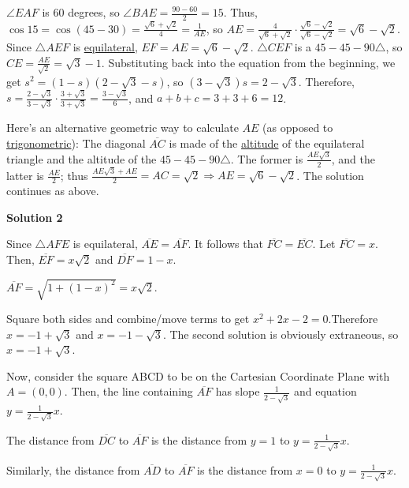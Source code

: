 \begin{enumerate}
 $\angle EAF$ is $60$ degrees, so $\angle BAE = \frac{90 - 60}{2} = 15$. Thus, $\cos 15 = \cos (45 - 30) = \frac{\sqrt{6} + \sqrt{2}}{4} = \frac{1}{AE}$, so $AE = \frac{4}{\sqrt{6} + \sqrt{2}} \cdot \frac{\sqrt{6} - \sqrt{2}}{\sqrt{6} - \sqrt{2}} = \sqrt{6} - \sqrt{2}$. Since $\triangle AEF$ is \href{https://artofproblemsolving.com/wiki/index.php?title=Equilateral}{equilateral}, $EF = AE = \sqrt{6} - \sqrt{2}$. $\triangle CEF$ is a $45-45-90 \triangle$, so $CE = \frac{AE}{\sqrt{2}} = \sqrt{3} - 1$. Substituting back into the equation from the beginning, we get $s^2 = (1 - s)(2 - \sqrt{3} - s)$, so $(3 - \sqrt{3})s = 2 - \sqrt{3}$. Therefore, $s = \frac{2 - \sqrt{3}}{3 - \sqrt{3}} \cdot \frac{3 + \sqrt{3}}{3 + \sqrt{3}} = \frac{3 - \sqrt{3}}{6}$, and $a + b + c = 3 + 3 + 6 = \boxed{12}$.

 Here's an alternative geometric way to calculate $AE$ (as opposed to \href{https://artofproblemsolving.com/wiki/index.php?title=Trigonometry}{trigonometric}): The diagonal $\overline{AC}$ is made of the \href{https://artofproblemsolving.com/wiki/index.php?title=Altitude}{altitude} of the equilateral triangle and the altitude of the $45-45-90 \triangle$. The former is $\frac{AE\sqrt{3}}{2}$, and the latter is $\frac{AE}{2}$; thus $\frac{AE\sqrt{3} + AE}{2} = AC = \sqrt{2} \Longrightarrow AE= \sqrt{6}-\sqrt{2}$. The solution continues as above.

 



\textbf{Solution 2}

Since $\triangle AFE$ is equilateral, $\overline{AE} = \overline{AF}$. It follows that $\overline{FC} = \overline{EC}$. Let $\overline{FC} = x$. Then, $\overline{EF} = x\sqrt{2}$ and $\overline{DF} = 1-x$.

 $\overline{AF} = \sqrt{1+(1-x)^2} = x\sqrt{2}$. 

 Square both sides and combine/move terms to get $x^2+2x-2 = 0$.Therefore $x = -1 + \sqrt{3}$ and $x = -1 - \sqrt{3}$. The second solution is obviously extraneous, so $x = -1 + \sqrt{3}$.

 Now, consider the square ABCD to be on the Cartesian Coordinate Plane with $A = (0,0)$. Then, the line containing $\overline{AF}$ has slope $\frac{1}{2-\sqrt{3}}$ and equation $y = \frac{1}{2-\sqrt{3}}x$.

 The distance from $\overline{DC}$ to $\overline{AF}$ is the distance from $y = 1$ to $y = \frac{1}{2-\sqrt{3}}x$.

 Similarly, the distance from $\overline{AD}$ to $\overline{AF}$ is the distance from $x = 0$ to $y = \frac{1}{2-\sqrt{3}}x$.


\end{enumerate}
